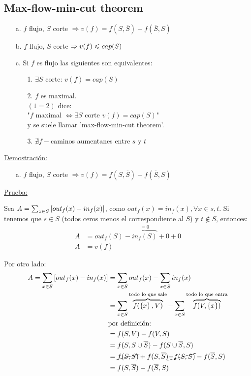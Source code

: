 \documentclass[12pt,a4paper]{article}
\begin{document}
\subsection{Max-flow-min-cut theorem}
\begin{teorema} 
    \begin{itemize}
        \item [a.] $f$ flujo, $S$ corte $\Rightarrow v(f) = f(S,\overline{S}) - f(\overline{S},S)$
        \item [b.] $f$ flujo, $S$ corte $\Rightarrow v(f) \leqslant cap(S)$
        \item [c.] Si $f$ es flujo las siguientes son equivalentes:
            \begin{itemize}
                \item [1.] $\exists S$ corte: $v(f) = cap(S)$
                \item [2.] $f$ es maximal.\\
                $(1=2)$ dice: \\
                "$f$ maximal $\Longleftrightarrow \exists S$ corte $v(f) = cap(S)$"\\
                y se suele llamar 'max-flow-min-cut theorem'.
                \item [3.] $\nexists f-$caminos aumentanes entre $s$ y $t$ 
            \end{itemize}
    \end{itemize}
\end{teorema}

\underline{Demostración:}
\medskip

\begin{itemize}
    \item [a.] $f$ flujo, $S$ corte $\Rightarrow v(f) = f(S,\overline{S}) - f(\overline{S},S)$
\end{itemize}

\underline{Prueba:}
\medskip

Sea $A = \sum_{x\in S} \left[out_{f}(x) - in_{f}(x)\right]$, como $out_{f}(x) = in_{f}(x), \forall x \in s,t$. 
Si tenemos que $s \in S$ (todos ceros menos el correspondiente al $S$) y $t \notin S$, entonces:
\begin{align*}
    A &= out_{f}(S) - \overbrace{in_{f}(S)}^{=0} + 0 + 0\\
    A &= v(f)
\end{align*}

Por otro lado:
\begin{align*}
    A = \sum_{x\in S} \left[out_{f}(x) - in_{f}(x)\right] &= \sum_{x\in S} out_{f}(x) - \sum_{x\in S} in_{f}(x)\\
    &= \sum_{x\in S} \overbrace{f(\left\lbrace x \right\rbrace,V)}^{\text{todo lo que sale}} - \sum_{x\in S} \overbrace{f(V,\left\lbrace x \right\rbrace)}^{\text{todo lo que entra}}\\
    &\text{por definición:}\\
    &= f(S,V) - f(V,S)\\
    &= f(S,S \cup \overline{S}) - f(S \cup \overline{S},S)\\
    &= \cancel{f(S,S)} + f(S,\overline{S}) \cancel{- f(S,S)} - f(\overline{S},S)\\
    &= f(S,\overline{S}) - f(\overline{S},S)
\end{align*}
\end{document}
